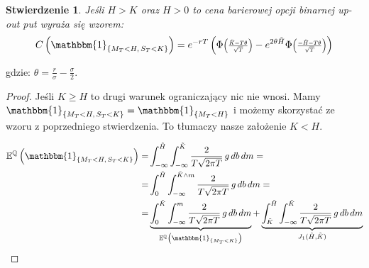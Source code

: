 \documentclass[11pt]{report}
\newtheorem{stw}{Stwierdzenie}[chapter]
\newcommand*{\Scale}[2][4]{\scalebox{#1}{$#2$}}%
\begin{document}
\begin{stw} Jeśli $H > K$ oraz $H > 0$ to cena barierowej opcji binarnej up-out put wyraża się wzorem:
\begin{equation*}
C\left( \mathbbm{1}_{ \{ M_T < H, \, S_T < K \} } \right) = e^{-rT}\left( \Phi \Scale[0.8]{\left(\frac{\tilde{K}-T\theta}{\sqrt{T}}\right)} - e^{2 \theta \tilde{H}} \Phi \Scale[0.8]{\left(\frac{-\tilde{H}-T\theta}{\sqrt{T}}\right)} \right)
\end{equation*}
\end{stw}
gdzie:  $\theta = \frac{r}{\sigma} - \frac{\sigma}{2}.  $
\begin{proof}
Jeśli $K \ge H $ to drugi warunek ograniczający nic nie wnosi. Mamy $\mathbbm{1}_{ \{ M_T < H, \, S_T < K \} } = \mathbbm{1}_{ \{ M_T < H \} }$ i możemy skorzystać ze wzoru z poprzedniego stwierdzenia. To tłumaczy nasze założenie $ K < H $.


\begin{multline*}
\begin{split}
\mathbb{E}^{\mathbb{Q}}\left(\mathbbm{1}_{ \{ M_T < H, \, S_T < K \} } \right) = & \int_{-\infty}^{\tilde{H}}\int_{-\infty}^{\tilde{K}} \frac{2}{T\sqrt{2\pi T}} \, g \, db \, dm = \\ = & \int_{0}^{\tilde{H}}\int_{-\infty}^{\tilde{K} \wedge m} \frac{2}{T\sqrt{2\pi T}} \, g \, db \, dm = \\ = & \underbrace{ \int_{0}^{\tilde{K}}\int_{-\infty}^{m} \frac{2}{T\sqrt{2\pi T}} \, g \, db \, dm}_{\mathbb{E}^{\mathbb{Q}}\left( \mathbbm{1}_{ \{ M_T<K \} } \right)}  +
\underbrace{ \int_{\tilde{K}}^{\tilde{H}}\int_{-\infty}^{\tilde{K}} \frac{2}{T\sqrt{2\pi T}} \, g \, db \, dm }_{J_1(\tilde{H}, \tilde{K})}
\end{split}
\end{multline*}


\end{proof}
\end{document}
